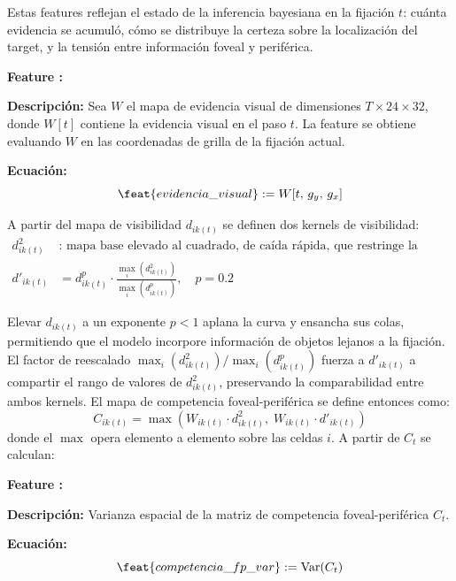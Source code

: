 Estas features reflejan el estado de la inferencia bayesiana en la
fijación $t$: cuánta evidencia se acumuló, cómo se distribuye
la certeza sobre la localización del target, y la tensión entre
información foveal y periférica.

\begin{featuredef}
\textbf{Feature \thetcbcounter:} 

\textbf{Descripción:} Sea $W$ el mapa de evidencia visual de dimensiones
$T \times 24 \times 32$, donde $W[t]$ contiene la evidencia visual en el paso $t$.
La feature se obtiene evaluando $W$ en las coordenadas de grilla de la fijación actual.

\textbf{Ecuación:}
\begin{equation}
    \feat{evidencia\_visual} := W[t,\, g_y,\, g_x]
\end{equation}
\end{featuredef}

A partir del mapa de visibilidad $d_{ik(t)}$ se definen dos kernels de visibilidad:
\begin{align}
    d^2_{ik(t)}  &: \text{ mapa base elevado al cuadrado, de caída 
                    rápida, que restringe la información a la región 
                    foveal} \\
    d'_{ik(t)} &= d^p_{ik(t)} \cdot 
                  \frac{\max_i\left(d^2_{ik(t)}\right)}
                       {\max_i\left(d^p_{ik(t)}\right)}, \quad p = 0.2
\end{align}

Elevar $d_{ik(t)}$ a un exponente $p < 1$ aplana la curva y ensancha 
sus colas, permitiendo que el modelo incorpore información de objetos lejanos a la fijación. El factor de reescalado 
$\max_i(d^2_{ik(t)})/\max_i(d^p_{ik(t)})$ fuerza a $d'_{ik(t)}$ a 
compartir el rango de valores de $d^2_{ik(t)}$, preservando la 
comparabilidad entre ambos kernels. El mapa de competencia 
foveal-periférica se define entonces como:
\begin{equation}
    C_{ik(t)} = \max\!\left(W_{ik(t)} \cdot d^2_{ik(t)},\;
                            W_{ik(t)} \cdot d'_{ik(t)}\right)
\end{equation}
donde el $\max$ opera elemento a elemento sobre las celdas $i$. 
A partir de $C_t$ se calculan:

\begin{featuredef}
\textbf{Feature \thetcbcounter:} 

\textbf{Descripción:} Varianza espacial de la matriz de competencia
foveal-periférica $C_t$.

\textbf{Ecuación:}
\begin{equation}
    \feat{competencia\_fp\_var} := \text{Var}(C_t)
\end{equation}
\end{featuredef}

